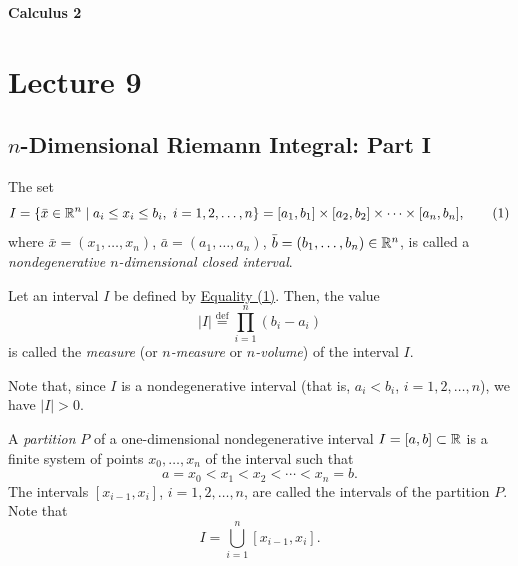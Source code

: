 
{\large\bfseries Calculus 2}

\section{Lecture 9}
\subsection*{$n$-Dimensional Riemann Integral: Part I}

\begin{definition}\label{def:9.1}
The set
\[
I=\{\bar{x}\in\R^n\mid a_i\leq x_i\leq b_i,\ i=1,2,\ldots,n\}
=[a_1,b_1]\times[a_2,b_2]\times\cdots\times[a_n,b_n],
\tag{1}\label{eq:9:1:1}
\]
where $\bar{x}=(x_1,\ldots,x_n)$, $\bar{a}=(a_1,\ldots,a_n)$, $\bar{b}=(b_1,\ldots,b_n)\in\mathbb{R}^n$, is called a \emph{nondegenerative $n$-dimensional closed interval}.
\end{definition}

\begin{definition}\label{def:9.2}
Let an interval $I$ be defined by \hyperref[eq:9:1:1]{Equality (1)}. Then, the value
\[
|I|\overset{\mathrm{def}}{=}\prod_{i=1}^{n}(b_i-a_i)
\]
is called the \emph{measure} (or \emph{$n$-measure} or \emph{$n$-volume}) of the interval $I$.

Note that, since $I$ is a nondegenerative interval (that is, $a_i<b_i$, $i=1,2,\ldots,n$), we have $|I|>0$.
\end{definition}

\begin{definition}\label{def:9.3}
A \emph{partition} $P$ of a one-dimensional nondegenerative interval $I=[a,b]\subset\mathbb{R}$ is a finite system of points $x_0,\ldots,x_n$ of the interval such that
\[
a=x_0<x_1<x_2<\cdots<x_n=b.
\]
The intervals $[x_{i-1},x_i]$, $i=1,2,\ldots,n$, are called the intervals of the partition $P$.
Note that
\[
I=\bigcup_{i=1}^{n}[x_{i-1},x_i].
\]
\end{definition}

